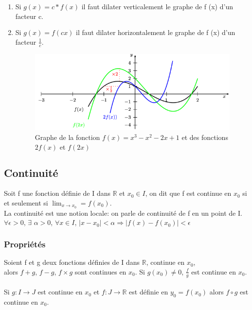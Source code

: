 \documentclass[a4paper,10pt]{book}
\newcommand{\R}{\mathbb{R}}
\begin{document}
\begin{enumerate}
\item Si $g(x)=c*f(x)$ il faut dilater verticalement le graphe de f (x) d’un facteur c.
\item Si $g(x)=f(cx)$ il faut dilater horizontalement le graphe de f (x) d’un facteur $\frac{1}{c}$.
\begin{figure}[h] \begin{center} \includegraphics[scale=0.5]{images/021.png} \caption{Graphe de la fonction $f(x)=x^{3}-x^{2}-2x+1$ et des fonctions $2f(x)$ et $f(2x)$} \end{center} \end{figure}
\end{enumerate}

\subsection{Continuité}
Soit f une fonction définie de I dans $\R$ et $x_{0} \in I$, on dit que f est continue en $x_{0}$ si et seulement si $\lim_{x \rightarrow x_{0}}=f(x_{0})$.\\
La continuité est une notion locale: on parle de continuité de f en un point de I.\\

$\forall \epsilon >0$, $\exists$ $\alpha >0$, $\forall x \in I$, $|x-x_{0}|<\alpha \Longrightarrow |f(x)-f(x_{0})|<\epsilon$

\subsubsection{Propriétés}
Soient f et g deux fonctions définies de I dans $\R$, continue en $x_{0}$, \\
alors $f+g$, $f-g$, $f\times g$ sont continues en $x_{0}$. Si $g(x_{0}) \neq 0$, $\frac{f}{g}$ est continue en $x_{0}$.\\ \\
Si $g : I \longrightarrow J$ est continue en $x_{0}$ et $f : J \longrightarrow \R$ est définie en $y_{0}=f(x_{0})$ alors $f\circ g$ est continue en $x_{0}$.
\end{document}
